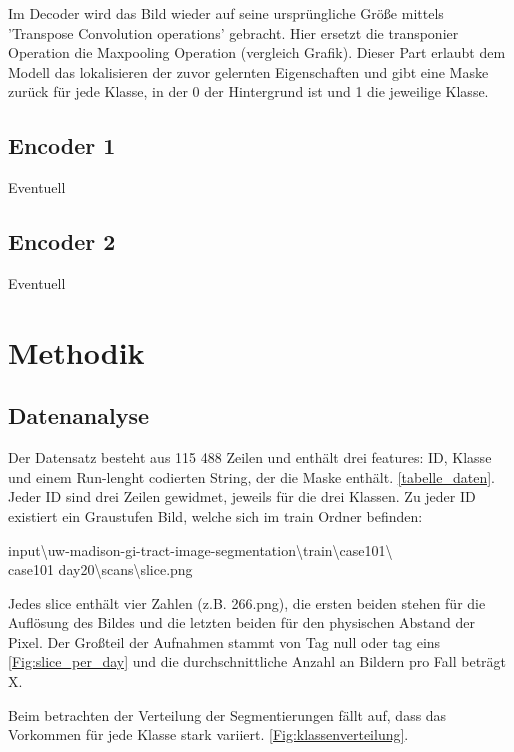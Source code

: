 Im Decoder wird das Bild wieder auf seine ursprüngliche Größe mittels 'Transpose Convolution operations' gebracht. Hier ersetzt die transponier Operation die Maxpooling Operation (vergleich Grafik). Dieser Part erlaubt dem Modell das lokalisieren der zuvor gelernten Eigenschaften und gibt eine Maske zurück für jede Klasse, in der 0 der Hintergrund ist und 1 die jeweilige Klasse. 

\subsection{Encoder 1}
Eventuell

\subsection{Encoder 2}
Eventuell


\section{Methodik}\raggedbottom

\subsection{Datenanalyse}
Der Datensatz besteht aus 115 488 Zeilen und enthält drei features: ID, Klasse und einem Run-lenght codierten String, der die Maske enthält. \autoref{tabelle_daten}. Jeder ID sind drei Zeilen gewidmet, jeweils für die drei Klassen. Zu jeder ID existiert ein Graustufen Bild, welche sich im train Ordner befinden: 

input\textbackslash uw-madison-gi-tract-image-segmentation\textbackslash train\textbackslash case101\textbackslash \\case101\textunderscore 
day20\textbackslash scans\textbackslash slice.png

Jedes slice enthält vier Zahlen (z.B. 266.png), die ersten beiden stehen für die Auflösung des Bildes und die letzten beiden für den physischen Abstand der Pixel. Der Großteil der Aufnahmen stammt von Tag null oder tag eins \autoref{Fig:slice_per_day} und die durchschnittliche Anzahl an Bildern pro Fall beträgt X.

Beim betrachten der Verteilung der Segmentierungen fällt auf, dass das Vorkommen für jede Klasse stark variiert. \autoref{Fig:klassenverteilung}.

